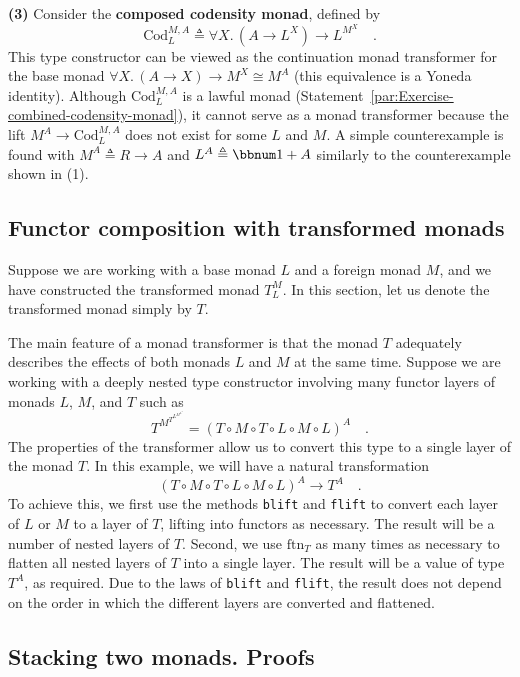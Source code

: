 \textbf{(3)} Consider the \textbf{composed codensity monad},
defined by
\[
\text{Cod}_{L}^{M,A}\triangleq\forall X.\,(A\rightarrow L^{X})\rightarrow L^{M^{X}}\quad.
\]
This type constructor can be viewed as the continuation monad transformer
for the base monad $\forall X.\,(A\rightarrow X)\rightarrow M^{X}\cong M^{A}$
(this equivalence is a Yoneda identity). Although $\text{Cod}_{L}^{M,A}$
is a lawful monad (Statement~\ref{par:Exercise-combined-codensity-monad}),
it cannot serve as a monad transformer because the lift $M^{A}\rightarrow\text{Cod}_{L}^{M,A}$
does not exist for some $L$ and $M$. A simple counterexample is
found with $M^{A}\triangleq R\rightarrow A$ and $L^{A}\triangleq\bbnum 1+A$
similarly to the counterexample shown in (1).

\subsection{Functor composition with transformed monads}

Suppose we are working with a base monad $L$ and a foreign monad
$M$, and we have constructed the transformed monad $T_{L}^{M}$.
In this section, let us denote the transformed monad simply by $T$. 

The main feature of a monad transformer is that the monad $T$ adequately
describes the effects of both monads $L$ and $M$ at the same time.
Suppose we are working with a deeply nested type constructor involving
many functor layers of monads $L$, $M$, and $T$ such as
\[
T^{M^{T^{L^{M^{L^{A}}}}}}=\left(T\circ M\circ T\circ L\circ M\circ L\right)^{A}\quad.
\]
The properties of the transformer allow us to convert this type to
a single layer of the monad $T$. In this example, we will have a
natural transformation
\[
\left(T\circ M\circ T\circ L\circ M\circ L\right)^{A}\rightarrow T^{A}\quad.
\]
To achieve this, we first use the methods \lstinline!blift! and \lstinline!flift!
to convert each layer of $L$ or $M$ to a layer of $T$, lifting
into functors as necessary. The result will be a number of nested
layers of $T$. Second, we use $\text{ftn}_{T}$ as many times as
necessary to flatten all nested layers of $T$ into a single layer.
The result will be a value of type $T^{A}$, as required. Due to the
laws of \lstinline!blift! and \lstinline!flift!, the result does
not depend on the order in which the different layers are converted
and flattened.

\subsection{Stacking two monads. Proofs\label{subsec:Stacking-two-monads}}

